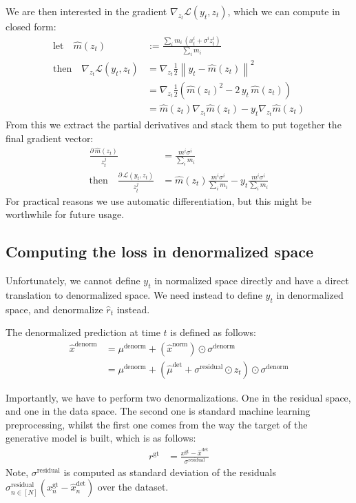 \documentclass[a4paper,12pt]{article}
\begin{document}
We are then interested in the gradient $\nabla_{z_t}\mathcal{L}(y_t, z_t)$, which we can compute in closed form:
\begin{align*} 
    \text{let} \quad \hat{m}(z_t) &:= \frac{\sum_i m_i \, (x_t^i + \sigma^i z_t^i)}{\sum_i m_i} \\
    \text{then} \quad \nabla_{z_t}\mathcal{L}(y_t, z_t) &= \nabla_{z_t}\frac{1}{2} \left\lVert y_t - \hat{m}(z_t) \right\lVert ^2 \\
    &= \nabla_{z_t}\frac{1}{2} \left(\hat{m}(z_t)^2 - 2 \,y_t \, \hat{m}(z_t) \right) \\
    &= \hat{m}(z_t) \nabla_{z_t} \hat{m}(z_t) - y_t \nabla_{z_t} \hat{m}(z_t) 
\end{align*}
From this we extract the partial derivatives and stack them to put together the final gradient vector:
\begin{align*}
     \frac{\partial \, \hat{m}(z_t)}{z_t^j} &= \frac{m^i\sigma^i}{\sum_i m_i} \\
    \text{then} \quad \frac{\partial \,  \mathcal{L}(y_t, z_t)}{z_t^j} &= \hat{m}(z_t) \frac{m^i\sigma^i}{\sum_i m_i} - y_t \frac{m^i\sigma^i}{\sum_i m_i}
\end{align*}
For practical reasons we use automatic differentiation, but this might be worthwhile for future usage.

\subsection{Computing the loss in denormalized space}
Unfortunately, we cannot define $y_t$ in normalized space directly and have a direct translation to denormalized space. We need instead to define $y_t$ in denormalized space, and denormalize $\hat{r}_t$ instead.

The denormalized prediction at time $t$ is defined as follows:
\begin{align*}
\hat{x}^\text{denorm} &= \mu^\text{denorm} + (\hat{x}^\text{norm}) \odot \sigma^\text{denorm} \\
&= \mu^\text{denorm} + (\hat{\mu}^\text{det} + \sigma^\text{residual} \odot z_t) \odot \sigma^\text{denorm}
\end{align*}

Importantly, we have to perform two denormalizations. One in the residual space, and one in the data space. The second one is standard machine learning preprocessing, whilst the first one comes from the way the target of the generative model is built, which is as follows:
\begin{align*}
r^\text{gt} &=  \frac{x^\text{gt} - \hat{x}^\text{det}}{\sigma^\text{residual}}
\end{align*}
Note, $\sigma^\text{residual}$ is computed as standard deviation of the residuals $\sigma^\text{residual}_{n \in [N]}(x^\text{gt}_n - \hat{x}_n^\text{det})$ over the dataset.
\end{document}
